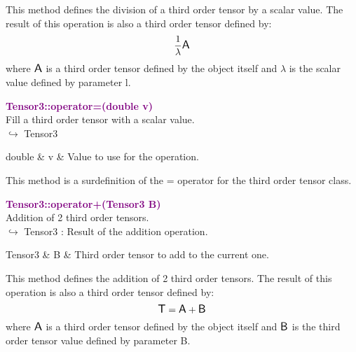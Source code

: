 This method defines the division of a third order tensor by a scalar value.
The result of this operation is also a third order tensor defined by:
\begin{equation*}
\frac{1}{\lambda} \mbox{\large\ensuremath{\mathsf{A}}}
\end{equation*}
where $\mbox{\large\ensuremath{\mathsf{A}}}$ is a third order tensor defined by the object itself and $\lambda$ is the scalar value defined by parameter l.

\textcolor{purple}{\textbf{Tensor3::operator=(double v)}}\label{Tensor3::operator=(double v)}\\
Fill a third order tensor with a scalar value.\\ \hspace*{10mm}$\hookrightarrow$ Tensor3

\begin{tcolorbox}[width=\textwidth,myArgs,tabularx={ll|R}]
double & v & Value to use for the operation.
\end{tcolorbox}

This method is a surdefinition of the = operator for the third order tensor class.

\textcolor{purple}{\textbf{Tensor3::operator+(Tensor3 B)}}\label{Tensor3::operator+(Tensor3 B)}\\
Addition of 2 third order tensors.\\ \hspace*{10mm}$\hookrightarrow$ Tensor3 : Result of the addition operation.

\begin{tcolorbox}[width=\textwidth,myArgs,tabularx={ll|R}]
Tensor3 & B & Third order tensor to add to the current one.
\end{tcolorbox}

This method defines the addition of 2 third order tensors.
The result of this operation is also a third order tensor defined by:
\begin{equation*}
\mbox{\large\ensuremath{\mathsf{T}}} = \mbox{\large\ensuremath{\mathsf{A}}} + \mbox{\large\ensuremath{\mathsf{B}}}
\end{equation*}
where $\mbox{\large\ensuremath{\mathsf{A}}}$ is a third order tensor defined by the object itself and $\mbox{\large\ensuremath{\mathsf{B}}}$ is the third order tensor value defined by parameter B.

